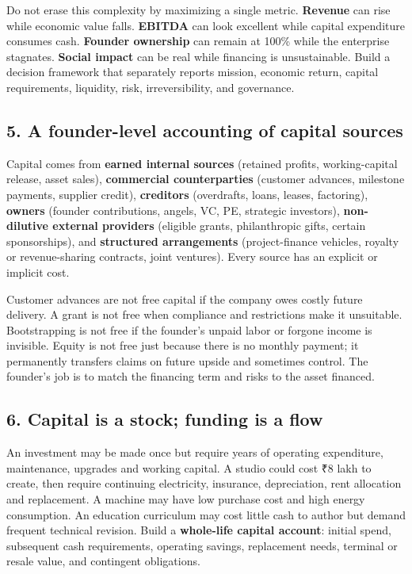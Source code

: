 Do not erase this complexity by maximizing a single metric. \textbf{Revenue} can rise while economic value falls. \textbf{EBITDA} can look excellent while capital expenditure consumes cash. \textbf{Founder ownership} can remain at 100\% while the enterprise stagnates. \textbf{Social impact} can be real while financing is unsustainable. Build a decision framework that separately reports mission, economic return, capital requirements, liquidity, risk, irreversibility, and governance.

\subsection{5. A founder-level accounting of capital sources}


Capital comes from \textbf{earned internal sources} (retained profits, working-capital release, asset sales), \textbf{commercial counterparties} (customer advances, milestone payments, supplier credit), \textbf{creditors} (overdrafts, loans, leases, factoring), \textbf{owners} (founder contributions, angels, VC, PE, strategic investors), \textbf{non-dilutive external providers} (eligible grants, philanthropic gifts, certain sponsorships), and \textbf{structured arrangements} (project-finance vehicles, royalty or revenue-sharing contracts, joint ventures). Every source has an explicit or implicit cost.

Customer advances are not free capital if the company owes costly future delivery. A grant is not free when compliance and restrictions make it unsuitable. Bootstrapping is not free if the founder's unpaid labor or forgone income is invisible. Equity is not free just because there is no monthly payment; it permanently transfers claims on future upside and sometimes control. The founder's job is to match the financing term and risks to the asset financed.

\subsection{6. Capital is a stock; funding is a flow}


An investment may be made once but require years of operating expenditure, maintenance, upgrades and working capital. A studio could cost ₹8 lakh to create, then require continuing electricity, insurance, depreciation, rent allocation and replacement. A machine may have low purchase cost and high energy consumption. An education curriculum may cost little cash to author but demand frequent technical revision. Build a \textbf{whole-life capital account}: initial spend, subsequent cash requirements, operating savings, replacement needs, terminal or resale value, and contingent obligations.

